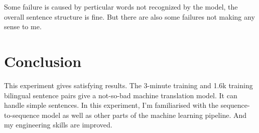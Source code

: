 \documentclass[journal, a4paper]{IEEEtran}
\begin{document}
Some failure is caused by perticular words not recognized by the model, the overall sentence structure is fine. But there are also some failures not making any sense to me.

\section{Conclusion}

This experiment gives satisfying results. The 3-minute training and 1.6k training bilingual sentence pairs give a not-so-bad machine translation model. It can handle simple sentences. In this experiment, I'm familiarised with the sequence-to-sequence model as well as other parts of the machine learning pipeline. And my engineering skills are improved.
\end{document}
